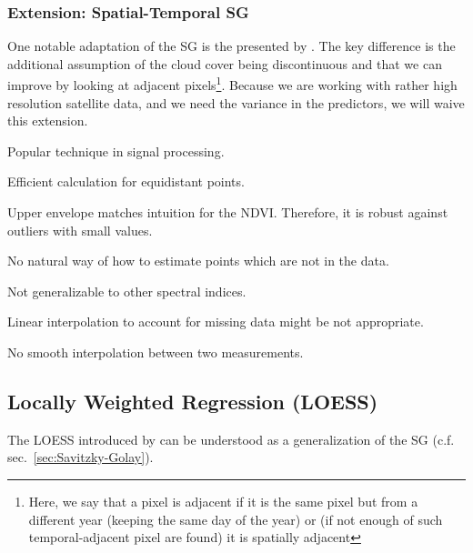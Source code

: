 		\subsubsection*{Extension: Spatial-Temporal SG}
			One notable adaptation of the SG is the presented by \cite{caoSimpleMethodImprove2018b}. The key difference is the additional assumption of the cloud cover being discontinuous and that we can improve by looking at adjacent pixels\footnote{Here, we say that a pixel is adjacent if it is the same pixel but from a different year (keeping the same day of the year) or (if not enough of such temporal-adjacent pixel are found) it is spatially adjacent}. Because we are working with rather high resolution satellite data, and we need the variance in the predictors, we will waive this extension.

		\begin{my_pros_cons_table}{
				\item Popular technique in signal processing.
				\item Efficient calculation for equidistant points.
				\item Upper envelope matches intuition for the NDVI. Therefore, it is robust against outliers with small values.
			}{
				\item No natural way of how to estimate points which are not in the data.
				\item Not generalizable to other spectral indices.
				\item Linear interpolation to account for missing data might be not appropriate.
				\item No smooth interpolation between two measurements.
			}
		\end{my_pros_cons_table}


	\subsection{Locally Weighted Regression (LOESS)}
		\label{sec:loess}

		The LOESS introduced by \cite{clevelandRobustLocallyWeighted1979} can be understood as a generalization of the SG (c.f. sec.~\ref{sec:Savitzky-Golay}).

